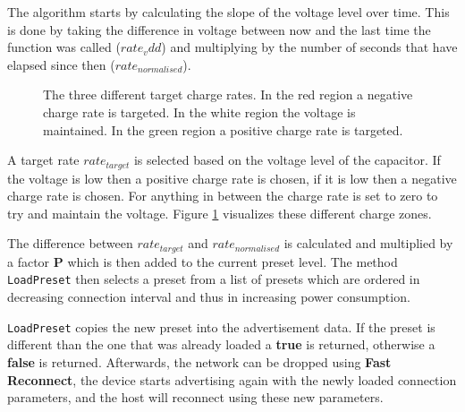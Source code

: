 The algorithm starts by calculating the slope of the voltage level over time. This is done by taking the difference in voltage between now and the last time the function was called ($rate_vdd$) and multiplying by the number of seconds that have elapsed since then ($rate_{normalised}$).

\begin{figure}
    \begin{center}
    \end{center}
    \label{fig:select_charge_rate}
    \caption{The three different target charge rates. In the red region a negative charge rate is targeted. In the white region the voltage is maintained. In the green region a positive charge rate is targeted.}
\end{figure}

A target rate $rate_{target}$ is selected based on the voltage level of the capacitor. If the voltage is low then a positive charge rate is chosen, if it is low then a negative charge rate is chosen. For anything in between the charge rate is set to zero to try and maintain the voltage. Figure \ref{fig:select_charge_rate} visualizes these different charge zones.

The difference between $rate_{target}$ and $rate_{normalised}$ is calculated and multiplied by a factor \textbf{P} which is then added to the current preset level. The method \texttt{LoadPreset} then selects a preset from a list of presets which are ordered in decreasing connection interval and thus in increasing power consumption.

\texttt{LoadPreset} copies the new preset into the advertisement data. If the preset is different than the one that was already loaded a \textbf{true} is returned, otherwise a \textbf{false} is returned. Afterwards, the network can be dropped using \textbf{Fast Reconnect}, the device starts advertising again with the newly loaded connection parameters, and the host will reconnect using these new parameters.

